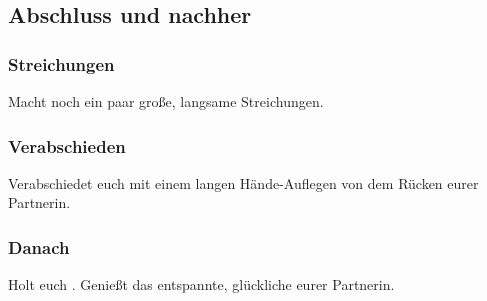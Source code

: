 \subsection{Abschluss und nachher}

\subsubsection{Streichungen}

Macht noch ein paar große, langsame Streichungen.

\subsubsection{Verabschieden}

Verabschiedet euch mit einem langen Hände-Auflegen von dem Rücken eurer Partnerin.

\subsubsection{Danach}
 Holt euch . Genießt das entspannte, glückliche  eurer Partnerin.
